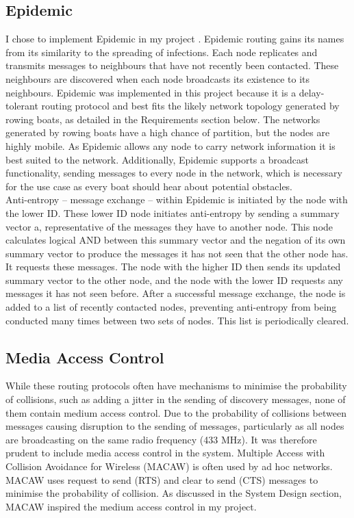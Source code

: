 \documentclass[12pt,a4paper]{report}
\begin{document}
\subsection{Epidemic}
I chose to implement Epidemic in my project \cite{epidemic}. Epidemic routing gains its names from its similarity to the spreading of infections. Each node replicates and transmits messages to neighbours that have not recently been contacted. These neighbours are discovered when each node broadcasts its existence to its neighbours. Epidemic was implemented in this project because it is a delay-tolerant routing protocol and best fits the likely network topology generated by rowing boats, as detailed in the Requirements section below. The networks generated by rowing boats have a high chance of partition, but the nodes are highly mobile. As Epidemic allows any node to carry network information it is best suited to the network. Additionally, Epidemic supports a broadcast functionality, sending messages to every node in the network, which is necessary for the use case as every boat should hear about potential obstacles. \\ 
Anti-entropy -- message exchange -- within Epidemic is initiated by the node with the lower ID. These lower ID node initiates anti-entropy by sending a summary vector a, representative of the messages they have to another node. This node calculates logical AND between this summary vector and the negation of its own summary vector to produce the messages it has not seen that the other node has. It requests these messages. The node with the higher ID then sends its updated summary vector to the other node, and the node with the lower ID requests any messages it has not seen before. After a successful message exchange, the node is added to a list of recently contacted nodes, preventing anti-entropy from being conducted many times between two sets of nodes. This list is periodically cleared. 

\subsection{Media Access Control}
While these routing protocols often have mechanisms to minimise the probability of collisions, such as adding a jitter in the sending of discovery messages, none of them contain medium access control. Due to the probability of collisions between messages causing disruption to the sending of messages, particularly as all nodes are broadcasting on the same radio frequency (433 MHz). It was  therefore prudent to include media access control in the system. Multiple Access with Collision Avoidance for Wireless (MACAW) is often used by ad hoc networks. MACAW uses request to send (RTS) and clear to send (CTS) messages to minimise the probability of collision. As discussed in the System Design section, MACAW inspired the medium access control in my project. 
\end{document}
